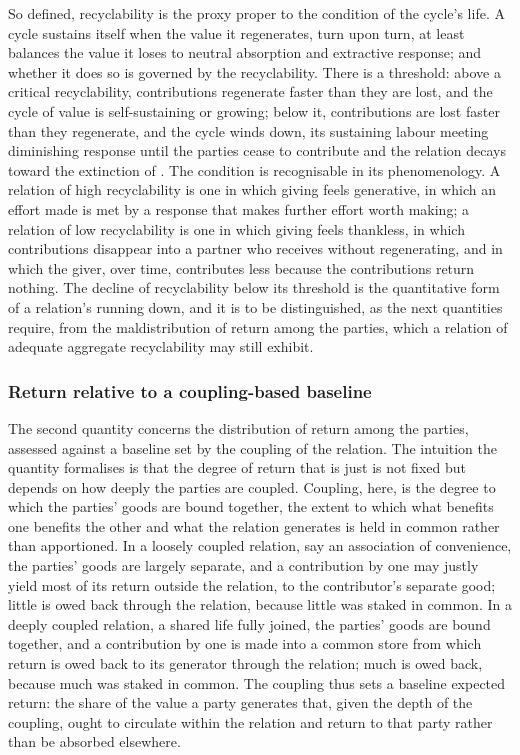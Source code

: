 So defined, recyclability is the proxy proper to the condition of the cycle's life. A cycle sustains itself when the value it regenerates, turn upon turn, at least balances the value it loses to neutral absorption and extractive response; and whether it does so is governed by the recyclability. There is a threshold: above a critical recyclability, contributions regenerate faster than they are lost, and the cycle of value is self-sustaining or growing; below it, contributions are lost faster than they regenerate, and the cycle winds down, its sustaining labour meeting diminishing response until the parties cease to contribute and the relation decays toward the extinction of . The condition is recognisable in its phenomenology. A relation of high recyclability is one in which giving feels generative, in which an effort made is met by a response that makes further effort worth making; a relation of low recyclability is one in which giving feels thankless, in which contributions disappear into a partner who receives without regenerating, and in which the giver, over time, contributes less because the contributions return nothing. The decline of recyclability below its threshold is the quantitative form of a relation's running down, and it is to be distinguished, as the next quantities require, from the maldistribution of return among the parties, which a relation of adequate aggregate recyclability may still exhibit.

\subsubsection{Return relative to a coupling-based baseline}
\label{p11:sec:ev-return}

The second quantity concerns the distribution of return among the parties, assessed against a baseline set by the coupling of the relation. The intuition the quantity formalises is that the degree of return that is just is not fixed but depends on how deeply the parties are coupled. Coupling, here, is the degree to which the parties' goods are bound together, the extent to which what benefits one benefits the other and what the relation generates is held in common rather than apportioned. In a loosely coupled relation, say an association of convenience, the parties' goods are largely separate, and a contribution by one may justly yield most of its return outside the relation, to the contributor's separate good; little is owed back through the relation, because little was staked in common. In a deeply coupled relation, a shared life fully joined, the parties' goods are bound together, and a contribution by one is made into a common store from which return is owed back to its generator through the relation; much is owed back, because much was staked in common. The coupling thus sets a baseline expected return: the share of the value a party generates that, given the depth of the coupling, ought to circulate within the relation and return to that party rather than be absorbed elsewhere.


